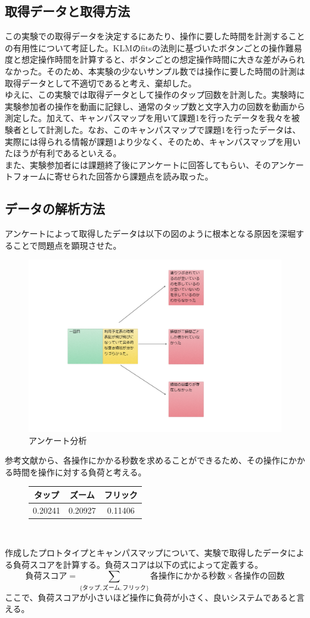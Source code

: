 \documentclass[12pt,a4paper,dvipdf]{jsarticle}
\begin{document}
\subsection{取得データと取得方法}
この実験での取得データを決定するにあたり、操作に要した時間を計測することの有用性について考証した。KLMのfitsの法則に基づいたボタンごとの操作難易度と想定操作時間を計算すると、ボタンごとの想定操作時間に大きな差がみられなかった。そのため、本実験の少ないサンプル数では操作に要した時間の計測は取得データとして不適切であると考え、棄却した。\\
ゆえに、この実験では取得データとして操作のタップ回数を計測した。実験時に実験参加者の操作を動画に記録し、通常のタップ数と文字入力の回数を動画から測定した。加えて、キャンパスマップを用いて課題1を行ったデータを我々を被験者として計測した。なお、このキャンパスマップで課題1を行ったデータは、実際には得られる情報が課題1より少なく、そのため、キャンパスマップを用いたほうが有利であるといえる。\\
また、実験参加者には課題終了後にアンケートに回答してもらい、そのアンケートフォームに寄せられた回答から課題点を読み取った。
\subsection{データの解析方法}
アンケートによって取得したデータは以下の図のように根本となる原因を深堀することで問題点を顕現させた。
\begin{figure}[H]
    \centering
    \includegraphics[width=0.8\columnwidth]{./img/アンケート分析.png}
    \caption{アンケート分析}
\end{figure}
参考文献から、各操作にかかる秒数を求めることができるため、その操作にかかる時間を操作に対する負荷と考える。\\
\begin{figure}[H]
    \centering
    \begin{tabular}{c|c|c}
        タップ     & ズーム     & フリック    \\
        \hline
        0.20241 & 0.20927 & 0.11406
    \end{tabular}\\
\end{figure}
作成したプロトタイプとキャンパスマップについて、実験で取得したデータによる負荷スコアを計算する。負荷スコアは以下の式によって定義する。
$$
    \text{負荷スコア} = \sum_{\{\text{タップ}, \text{ズーム}, \text{フリック} \}} \text{各操作にかかる秒数} \times \text{各操作の回数}
$$
ここで、負荷スコアが小さいほど操作に負荷が小さく、良いシステムであると言える。
\end{document}

